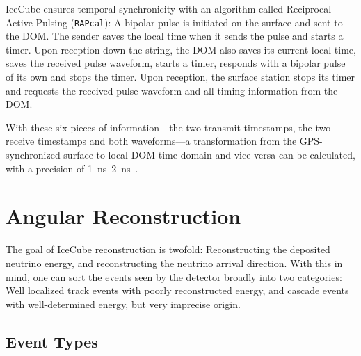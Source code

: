 IceCube ensures temporal synchronicity with an algorithm called Reciprocal Active Pulsing (\texttt{RAPcal}): A bipolar pulse is initiated on the surface and sent to the DOM. The sender saves the local time when it sends the pulse and starts a timer. Upon reception down the string, the DOM also saves its current local time, saves the received pulse waveform, starts a timer, responds with a bipolar pulse of its own and stops the timer. Upon reception, the surface station stops its timer and requests the received pulse waveform and all timing information from the DOM.

With these six pieces of information---the two transmit timestamps, the two receive timestamps and both waveforms---a transformation from the GPS-synchronized surface to local DOM time domain and vice versa can be calculated, with a precision of \SIrange{1}{2}{\ns}~\cite{Abbasi2009}.

\section{Angular Reconstruction}\label{reconstruction}

The goal of IceCube reconstruction is twofold: Reconstructing the deposited neutrino energy, and reconstructing the neutrino arrival direction. With this in mind, one can sort the events seen by the detector broadly into two categories: Well localized track events with poorly reconstructed energy, and cascade events with well-determined energy, but very imprecise origin.

\subsection{Event Types}\label{ic_event_types}

